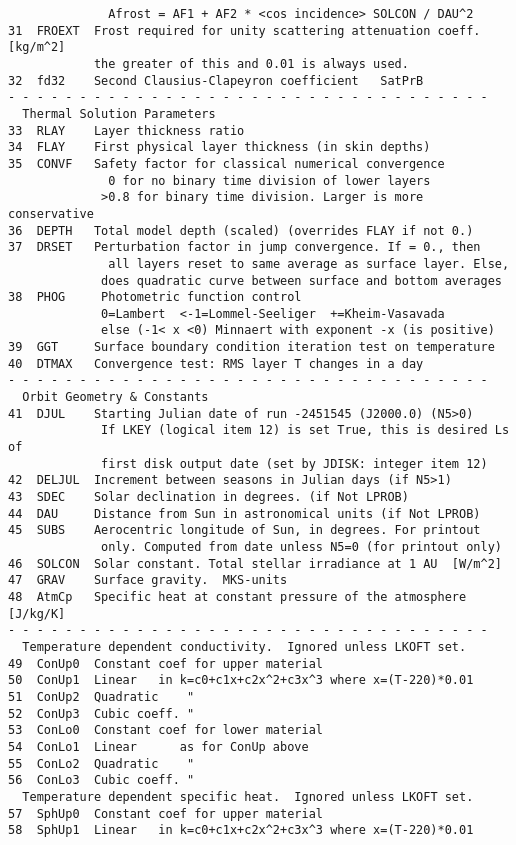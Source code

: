 \documentclass{article}
\begin{document}
\begin{verbatim}
              Afrost = AF1 + AF2 * <cos incidence> SOLCON / DAU^2
31  FROEXT  Frost required for unity scattering attenuation coeff. [kg/m^2]
            the greater of this and 0.01 is always used.
32  fd32    Second Clausius-Clapeyron coefficient   SatPrB
- - - - - - - - - - - - - - - - - - - - - - - - - - - - - - - - - - 
  Thermal Solution Parameters
33  RLAY    Layer thickness ratio
34  FLAY    First physical layer thickness (in skin depths)
35  CONVF   Safety factor for classical numerical convergence
              0 for no binary time division of lower layers
             >0.8 for binary time division. Larger is more conservative
36  DEPTH   Total model depth (scaled) (overrides FLAY if not 0.)
37  DRSET   Perturbation factor in jump convergence. If = 0., then
              all layers reset to same average as surface layer. Else,
             does quadratic curve between surface and bottom averages
38  PHOG     Photometric function control
             0=Lambert  <-1=Lommel-Seeliger  +=Kheim-Vasavada
             else (-1< x <0) Minnaert with exponent -x (is positive)
39  GGT     Surface boundary condition iteration test on temperature
40  DTMAX   Convergence test: RMS layer T changes in a day
- - - - - - - - - - - - - - - - - - - - - - - - - - - - - - - - - - 
  Orbit Geometry & Constants
41  DJUL    Starting Julian date of run -2451545 (J2000.0) (N5>0)
             If LKEY (logical item 12) is set True, this is desired Ls of 
             first disk output date (set by JDISK: integer item 12)
42  DELJUL  Increment between seasons in Julian days (if N5>1)
43  SDEC    Solar declination in degrees. (if Not LPROB)
44  DAU     Distance from Sun in astronomical units (if Not LPROB)
45  SUBS    Aerocentric longitude of Sun, in degrees. For printout 
             only. Computed from date unless N5=0 (for printout only)
46  SOLCON  Solar constant. Total stellar irradiance at 1 AU  [W/m^2]
47  GRAV    Surface gravity.  MKS-units
48  AtmCp   Specific heat at constant pressure of the atmosphere [J/kg/K]
- - - - - - - - - - - - - - - - - - - - - - - - - - - - - - - - - - 
  Temperature dependent conductivity.  Ignored unless LKOFT set.
49  ConUp0  Constant coef for upper material 
50  ConUp1  Linear   in k=c0+c1x+c2x^2+c3x^3 where x=(T-220)*0.01
51  ConUp2  Quadratic    " 
52  ConUp3  Cubic coeff. "
53  ConLo0  Constant coef for lower material 
54  ConLo1  Linear      as for ConUp above
55  ConLo2  Quadratic    "
56  ConLo3  Cubic coeff. "
  Temperature dependent specific heat.  Ignored unless LKOFT set.
57  SphUp0  Constant coef for upper material 
58  SphUp1  Linear   in k=c0+c1x+c2x^2+c3x^3 where x=(T-220)*0.01

\end{verbatim}
\end{document}
